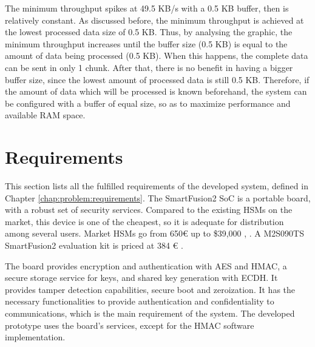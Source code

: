 The minimum throughput spikes at 49.5 KB/s with a 0.5 KB buffer, then is relatively constant. As discussed before, the minimum throughput is achieved at the lowest processed data size of 0.5 KB. Thus, by analysing the graphic, the minimum throughput increases until the buffer size (0.5 KB) is equal to the amount of data being processed (0.5 KB).
When this happens, the complete data can be sent in only 1 chunk.
After that, there is no benefit in having a bigger buffer size, since the lowest amount of processed data is still 0.5 KB.
Therefore, if the amount of data which will be processed is known beforehand, the system can be configured with a buffer of equal size, so as to maximize performance and available RAM space.

\section{Requirements}\label{chap:evaluation:requirements}

This section lists all the fulfilled requirements of the developed system, defined in Chapter \ref{chap:problem:requirements}.
The SmartFusion2 SoC is a portable board, with a robust set of security services.
Compared to the existing HSMs on the market, this device is one of the cheapest, so it is adequate for distribution among several users. Market HSMs go from 650€ up to \$39,000 \cite{HSMpriceArticles}, \cite{HSMPresentationPrices}. A M2S090TS SmartFusion2 evaluation kit is priced at 384 € \cite{smartfusionPrice}.

The board provides encryption and authentication with AES and HMAC, a secure storage service for keys, and shared key generation with ECDH. It provides tamper detection capabilities, secure boot and zeroization.
It has the necessary functionalities to provide authentication and confidentiality to communications, which is the main requirement of the system.
The developed prototype uses the board's services, except for the HMAC software implementation.

